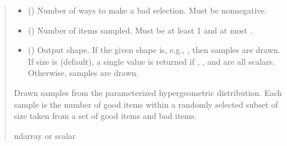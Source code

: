 \documentclass[letterpaper,10pt,english]{sphinxmanual}
\begin{document}
\begin{fulllineitems}
\begin{quote}
\begin{description}
\begin{itemize}
\item {} 
\sphinxAtStartPar
{} () \textendash{} Number of ways to make a bad selection.  Must be nonnegative.

\item {} 
\sphinxAtStartPar
{} () \textendash{} Number of items sampled.  Must be at least 1 and at most
.

\item {} 
\sphinxAtStartPar
{} (\sphinxstyleliteralemphasis{\sphinxupquote{, }}) \textendash{} Output shape.  If the given shape is, e.g., , then
 samples are drawn.  If size is  (default),
a single value is returned if , , and 
are all scalars.  Otherwise, 
samples are drawn.

\end{itemize}

\sphinxAtStartPar
{} \textendash{} Drawn samples from the parameterized hypergeometric distribution. Each
sample is the number of good items within a randomly selected subset of
size  taken from a set of  good items and  bad items.

\sphinxAtStartPar
ndarray or scalar

\end{description}\end{quote}



\end{fulllineitems}
\end{document}
